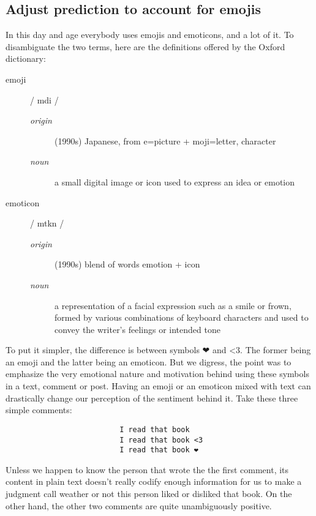 \subsection*{Adjust prediction to account for emojis\label{sec:adjust-prediction-to-account-for-emojis}}
In this day and age everybody uses emojis and emoticons, and a lot of it. 
To disambiguate the two terms, here are the definitions offered by the Oxford dictionary:
\begin{description}
 \item[emoji]/ \textsci \textprimstress m\textschwa \textupsilon d\textyogh i /
   \begin{description}
   \item[\emph{origin}] (1990s) Japanese, from e=picture + moji=letter, character
   \item[\emph{noun}] a small digital image or icon used to express an idea or emotion
  \end{description}
 \item[emoticon]/ \textsci \textprimstress m\textschwa \textupsilon t\textsci k\textturnscripta n /
   \begin{description}
   \item[\emph{origin}] (1990s) blend of words emotion + icon
   \item[\emph{noun}] a representation of a facial expression such as a smile or frown, formed by various combinations of keyboard characters and used to convey the writer's feelings or intended tone
  \end{description}
\end{description}
To put it simpler, the difference is between symbols ❤ and \textless3. The former being an emoji and the latter being an emoticon. But we digress, the point was to emphasize the very emotional nature and motivation behind using these symbols in a text, comment or post. 
Having an emoji or an emoticon mixed with text can drastically change our perception of the sentiment behind it. Take these three simple comments: 
\begin{verbatim}
                          I read that book
                          I read that book <3
                          I read that book ❤
\end{verbatim}
Unless we happen to know the person that wrote the the first comment, its content in plain text doesn't really codify enough information for us to make a judgment call weather or not this person liked or disliked that book. On the other hand, the other two comments are quite unambiguously positive. 
